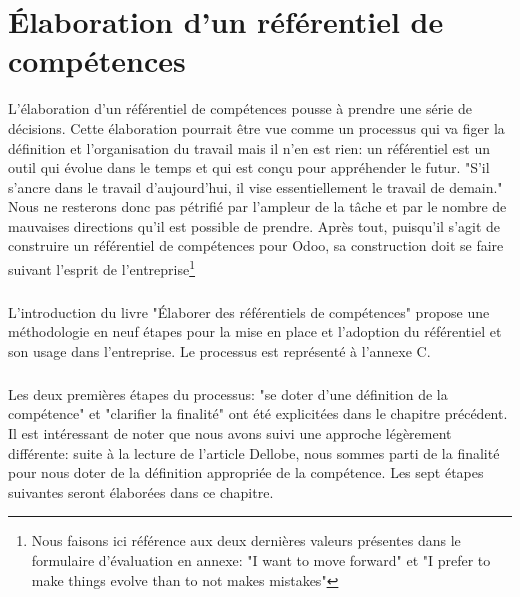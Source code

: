 \chapter{Élaboration d'un référentiel de compétences}
L'élaboration d'un référentiel de compétences pousse à prendre une série de décisions. Cette élaboration pourrait être vue comme un processus qui va figer la définition et l'organisation du travail mais il n'en est rien: un référentiel est un outil qui évolue dans le temps et qui est conçu pour appréhender le futur. "S'il s'ancre dans le travail d'aujourd'hui, il vise essentiellement le travail de demain."\citep[pp.19]{refcompetence} Nous ne resterons donc pas pétrifié par l'ampleur de la tâche et par le nombre de mauvaises directions qu'il est possible de prendre. Après tout, puisqu'il s'agit de construire un référentiel de compétences pour Odoo, sa construction doit se faire suivant l'esprit de l'entreprise\footnote{Nous faisons ici référence aux deux dernières valeurs présentes dans le formulaire d'évaluation en annexe: "I want to move forward" et "I prefer to make things evolve than to not makes mistakes"} 

\paragraph{}L'introduction du livre "Élaborer des référentiels de compétences"\citep{refcompetence} propose une méthodologie en neuf étapes pour la mise en place et l'adoption du référentiel et son usage dans l'entreprise. Le processus est représenté à l'annexe C. 

\paragraph{} Les deux premières étapes du processus: "se doter d'une définition de la compétence" et "clarifier la finalité" ont été explicitées dans le chapitre précédent. Il est intéressant de noter que nous avons suivi une approche légèrement différente: suite à la lecture de l'article Dellobe\citep{delobbe}, nous sommes parti de la finalité pour nous doter de la définition appropriée de la compétence. Les sept étapes suivantes seront élaborées dans ce chapitre.


